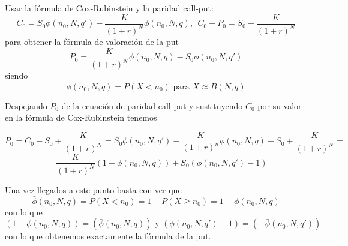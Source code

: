 \begin{problem}[6]
Usar la fórmula de Cox-Rubinstein y la paridad call-put:
\[C_0=S_0 \phi(n_0,N,q')-\frac{K}{(1+r)^N}\phi(n_0,N,q), \ \ C_0-P_0=S_0-\frac{K}{(1+r)^N}\]
para obtener la fórmula de valoración de la put
\[P_0=\frac{K}{(1+r)^N}\bar{\phi}(n_0,N,q)-S_0\bar{\phi}(n_0,N,q')\]
siendo
\[\bar{\phi}(n_0,N,q)=P(X<n_0) \text{ para } X \approx B(N,q)\]
\solution
{}

Despejando $P_0$ de la ecuación de paridad call-put y sustituyendo $C_0$ por su valor en la fórmula de Cox-Rubinstein tenemos

\[P_0 = C_0-S_0+\frac{K}{(1+r)^N} = S_0 \phi(n_0,N,q')-\frac{K}{(1+r)^n}\phi(n_0,N,q)- S_0 + \frac{K}{(1+r)^N} =\]
\[ = \frac{K}{(1+r)^N}\left(1-\phi(n_0,N,q) \right) + S_0\left(\phi(n_0,N,q') -1\right)\]

Una vez llegados a este punto basta con ver que
\[\bar{\phi}(n_0,N,q) = P(X<n_0) = 1- P(X \geq n_0) = 1-\phi(n_0,N,q)\]
con lo que
\[\left(1-\phi(n_0,N,q) \right) = \left(\bar{\phi}(n_0,N,q) \right) \text{ y } \left(\phi(n_0,N,q') -1\right) = \left(-\bar{\phi}(n_0,N,q') \right)\]
con lo que obtenemos exactamente la fórmula de la put.
\end{problem}

